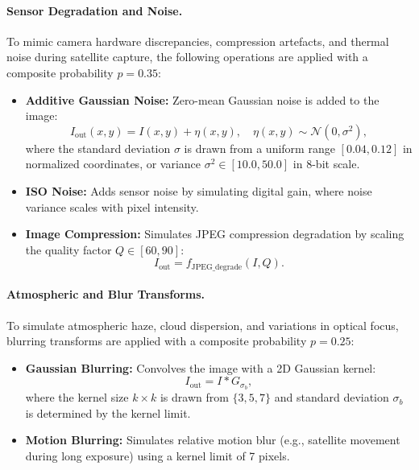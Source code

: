 \documentclass[12pt,a4paper]{article}
\begin{document}
\paragraph{Sensor Degradation and Noise.}
To mimic camera hardware discrepancies, compression artefacts, and thermal noise during satellite capture, the following operations are applied with a composite probability $p = 0.35$:
\begin{itemize}[leftmargin=*]
    \item \textbf{Additive Gaussian Noise:} Zero-mean Gaussian noise is added to the image:
    \begin{equation}
        I_{\text{out}}(x, y) = I(x, y) + \eta(x, y), \quad \eta(x, y) \sim \mathcal{N}(0, \sigma^2),
    \end{equation}
    where the standard deviation $\sigma$ is drawn from a uniform range $[0.04, 0.12]$ in normalized coordinates, or variance $\sigma^2 \in [10.0, 50.0]$ in 8-bit scale.
    
    \item \textbf{ISO Noise:} Adds sensor noise by simulating digital gain, where noise variance scales with pixel intensity.
    
    \item \textbf{Image Compression:} Simulates JPEG compression degradation by scaling the quality factor $Q \in [60, 90]$:
    \begin{equation}
        I_{\text{out}} = f_{\text{JPEG\_degrade}}(I, Q).
    \end{equation}
\end{itemize}

\paragraph{Atmospheric and Blur Transforms.}
To simulate atmospheric haze, cloud dispersion, and variations in optical focus, blurring transforms are applied with a composite probability $p = 0.25$:
\begin{itemize}[leftmargin=*]
    \item \textbf{Gaussian Blurring:} Convolves the image with a 2D Gaussian kernel:
    \begin{equation}
        I_{\text{out}} = I * G_{\sigma_b},
    \end{equation}
    where the kernel size $k \times k$ is drawn from $\{3, 5, 7\}$ and standard deviation $\sigma_b$ is determined by the kernel limit.
    
    \item \textbf{Motion Blurring:} Simulates relative motion blur (e.g., satellite movement during long exposure) using a kernel limit of 7 pixels.
\end{itemize}
\end{document}
